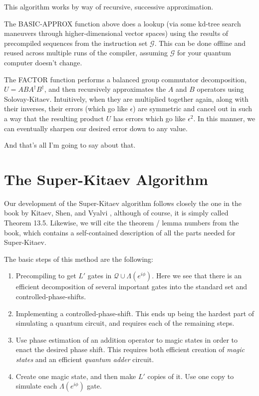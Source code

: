 \documentclass{article}
\theoremstyle{plain}
\begin{document}
This algorithm works by way of recursive, successive approximation.

The BASIC-APPROX function above does a lookup (via some kd-tree search
maneuvers through higher-dimensional vector spaces) using the results of
precompiled sequences from the instruction set $\mathcal{G}$. This can be
done offline and reused across multiple runs of the compiler, assuming
$\mathcal{G}$ for your quantum computer doesn't change.

The FACTOR function performs a balanced group commutator decomposition,
$U = ABA^\dagger B^\dagger$, and then recursively approximates the $A$ and $B$
operators using Solovay-Kitaev. Intuitively, when they are multiplied
together again, along with their inverses, their errors (which go like
$\epsilon$) are symmetric and cancel out in such a way that the resulting
product $U$ has errors which go like $\epsilon^2$. In this manner, we can
eventually sharpen our desired error down to any value.

And that's all I'm going to say about that.

\section{The Super-Kitaev Algorithm}

Our development of the Super-Kitaev algorithm follows closely the one in the
book by Kitaev, Shen, and Vyalvi \cite{ksv2002}, although of course, it is
simply called Theorem 13.5. Likewise, we will cite the theorem / lemma numbers
from the book, which contains a self-contained description of all the parts
needed for Super-Kitaev.

The basic steps of this method are the following:

\begin{enumerate}
\item Precompiling to get $L'$ gates in $\mathcal{Q} \cup \Lambda(e^{i\phi})$.
Here we see that there is an
efficient decomposition of several important gates into the standard set and
controlled-phase-shifts.
\item Implementing a controlled-phase-shift. This ends up being the hardest
part of simulating a quantum circuit, and requires each of the remaining steps.
\item Use phase estimation of an addition operator to magic states in order to
enact the desired phase shift. This requires both efficient creation of
{\em magic states} and an efficient {\em quantum adder} circuit.
\item Create one magic state, and then make $L'$ copies of it. Use one copy
to simulate each $\Lambda(e^{i\phi})$ gate.
\end{enumerate}
\end{document}
